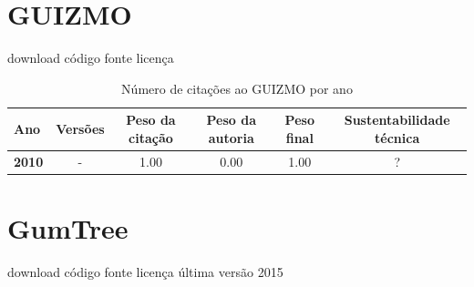 \section{GUIZMO}
\checkmark download
\checkmark código fonte
\checkmark licença



\begin{table}[H]
\caption{Número de citações ao GUIZMO por ano}
\centering
\begin{tabular}{| l | c | c | c | c | c |}
  \hline
  Ano & Versões & Peso da citação & Peso da autoria & Peso final & Sustentabilidade técnica \\
  \hline
            {\bf 2010}
          &
          -
          &
          1.00
          &
          0.00
          &
            {\color{blue} 1.00}
          &
          ?
          \\
\hline
\end{tabular}
\end{table}



\section{GumTree}
\checkmark download
\checkmark código fonte
\checkmark licença
\checkmark última versão 2015



